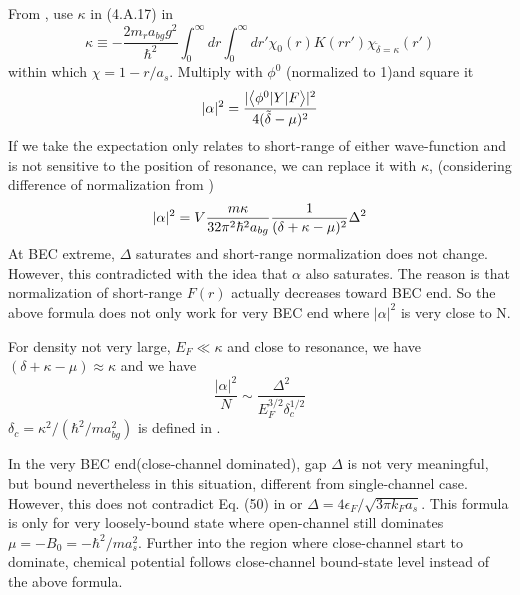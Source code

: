 From , use $\kappa$ in (4.A.17) in \cite{Leggett} 
\begin{equation}
\kappa\equiv-\frac{2m_{r}a_{bg}g^{2}}{\hbar^{2}}\int^{\infty}_{0}dr\int^{\infty}_{0}dr'\chi_{0}(r)K(rr')\chi_{{\tilde\delta=\kappa}}(r')
\end{equation}
within which $\chi=1-r/a_{s}$.  
Multiply  with $\phi^{0}$ (normalized to 1)and square it
\begin{equation}
|\alpha|^{2}=\frac{\lvert{\ensuremath{\bigl<{\phi^{0}{\lvert{Y}\rvert}F}\bigr>}}\rvert^{2}}{4(\tilde\delta-\mu)^{2}}
\end{equation}
If we take the expectation only relates to short-range of either wave-function and is not sensitive to the position of resonance, we can replace it with $\kappa$,  (considering difference of normalization from )
\begin{equation}
|\alpha|^{2}=V\frac{m\kappa}{32\pi^{2}\hbar^{2}a_{bg}}\frac{1}{(\delta+\kappa-\mu)^{2}}\Delta^{2}
\end{equation}
At BEC extreme, $\Delta$ saturates and short-range normalization does not change.  However, this contradicted with the idea that $\alpha$ also saturates. The reason is that normalization of short-range $F(r)$ actually decreases toward BEC end.  So the above formula does not only work for very BEC end where $|\alpha|^{2}$ is very close to N.   

For density not very large, $E_{F}\ll\kappa$ and close to resonance, we have $(\delta+\kappa-\mu)\approx\kappa$ and we have 
\begin{equation}
\frac{|\alpha|^{2}}{N}\sim\frac{\Delta^{2}}{E_{F}^{3/2}\delta_{c}^{1/2}}
\end{equation}
$\delta_{c}=\kappa^{2}/(\hbar^{2}/ma_{bg}^{2})$ is defined in \cite{Leggett}.


In the very BEC end(close-channel dominated), gap $\Delta$ is not very meaningful, but bound nevertheless in this situation, different from single-channel case.  However, this does not contradict Eq. (50) in \cite{shizhongUniv} or $\Delta=4\epsilon_F/\sqrt{3\pi{}k_Fa_s}$.  This formula is only for very loosely-bound state where open-channel still dominates $\mu=-B_0=-\hbar^2/ma_s^2$. Further into the region where close-channel start to dominate, chemical potential follows close-channel bound-state  level instead of the above formula.
